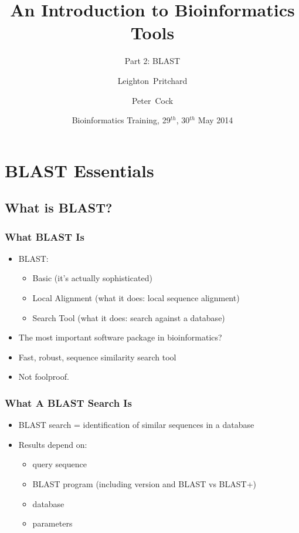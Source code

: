 \documentclass[table]{beamer}
\title[Intro to Bioinformatics] %
{An Introduction to Bioinformatics Tools}
\subtitle{Part 2: BLAST}
\author[Pritchard, Cock] %
{Leighton~Pritchard \and Peter~Cock}
\institute[The James Hutton Institute] %
{
  Information and Computational Sciences\\
  The James Hutton Institute
}
\date[May 2014] %
{Bioinformatics Training, 29$^{th}$, 30$^{th}$ May 2014}
\begin{document}
  \frame[plain]{\titlepage}
  
  \section{BLAST Essentials}
  
    \subsection{What is BLAST?}
    \begin{frame}
     \frametitle{What BLAST Is}
     \begin{itemize}
       \item<1-> BLAST:
       \begin{itemize}
         \item<1-> Basic (it's actually sophisticated)
         \item<1-> Local Alignment (what it does: local sequence alignment)
         \item<1-> Search Tool (what it does: search against a database)
       \end{itemize}
       \item<2-> The most important software package in bioinformatics?
       \item<2-> Fast, robust, sequence similarity search tool
       \item<2-> Not foolproof.
     \end{itemize}
    \end{frame}
  
    \begin{frame}
     \frametitle{What A BLAST Search Is}
     \begin{itemize}
       \item BLAST search = identification of similar sequences in a database
       \item Results depend on:
       \begin{itemize}
         \item query sequence
         \item BLAST program (including version and BLAST vs BLAST+)
         \item database
         \item parameters
       \end{itemize}
     \end{itemize}
    \end{frame}  
  
\end{document}
